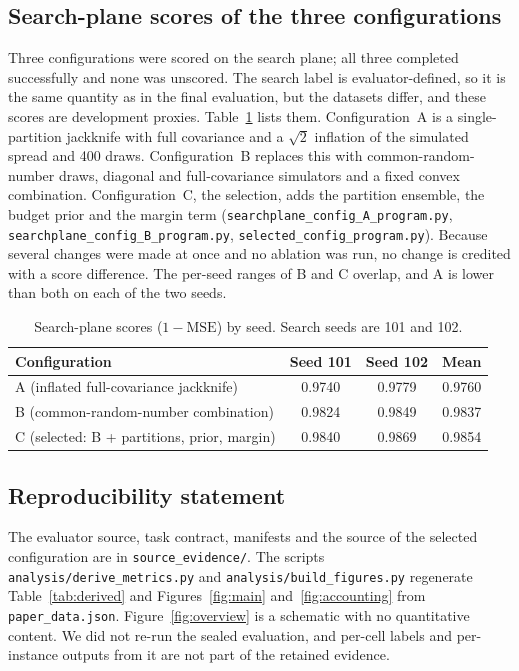 \documentclass{article}
\begin{document}
\subsection{Search-plane scores of the three configurations}
Three configurations were scored on the search plane; all three completed successfully and none was unscored. The search label is evaluator-defined, so it is the same quantity as in the final evaluation, but the datasets differ, and these scores are development proxies. Table~\ref{tab:search} lists them. Configuration~A is a single-partition jackknife with full covariance and a $\sqrt2$ inflation of the simulated spread and 400 draws. Configuration~B replaces this with common-random-number draws, diagonal and full-covariance simulators and a fixed convex combination. Configuration~C, the selection, adds the partition ensemble, the budget prior and the margin term (\texttt{searchplane\_config\_A\_program.py}, \texttt{searchplane\_config\_B\_program.py}, \texttt{selected\_config\_program.py}). Because several changes were made at once and no ablation was run, no change is credited with a score difference. The per-seed ranges of B and C overlap, and A is lower than both on each of the two seeds.
\begin{table}[h]
\centering
\caption{Search-plane scores ($1-\text{MSE}$) by seed. Search seeds are 101 and 102.}
\label{tab:search}
\small
\begin{tabular}{lccc}
\toprule
Configuration & Seed 101 & Seed 102 & Mean \\
\midrule
A (inflated full-covariance jackknife) & 0.9740 & 0.9779 & 0.9760 \\
B (common-random-number combination) & 0.9824 & 0.9849 & 0.9837 \\
C (selected: B + partitions, prior, margin) & 0.9840 & 0.9869 & 0.9854 \\
\bottomrule
\end{tabular}
\end{table}

\subsection{Reproducibility statement}
The evaluator source, task contract, manifests and the source of the selected configuration are in \texttt{source\_evidence/}. The scripts \texttt{analysis/derive\_metrics.py} and \texttt{analysis/build\_figures.py} regenerate Table~\ref{tab:derived} and Figures~\ref{fig:main} and~\ref{fig:accounting} from \texttt{paper\_data.json}. Figure~\ref{fig:overview} is a schematic with no quantitative content. We did not re-run the sealed evaluation, and per-cell labels and per-instance outputs from it are not part of the retained evidence.
\end{document}
